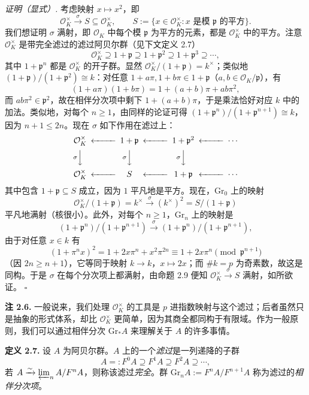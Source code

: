 \textit{证明（显式）.} 考虑映射 $x\mapsto x^2$，即
\[
  \mathcal{O}_K^{\times}\xrightarrow{\ \sigma\ }S\subseteq\mathcal{O}_K^{\times},
  \qquad S:=\{x\in\mathcal{O}_K^{\times}:x \text{ 是模 } \mathfrak{p} \text{ 的平方}\}.
\]
我们想证明 $\sigma$ 满射，即 $\mathcal{O}_K$ 中每个模 $\mathfrak{p}$ 为平方的元素，都是 $\mathcal{O}_K^{\times}$ 中的平方。注意 $\mathcal{O}_K^{\times}$ 是带完全滤过的滤过阿贝尔群（见下文定义 2.7）
\[
  \mathcal{O}_K^{\times}\supseteq 1+\mathfrak{p}\supseteq 1+\mathfrak{p}^2\supseteq 1+\mathfrak{p}^3\supseteq\cdots,
\]
其中 $1+\mathfrak{p}^n$ 都是 $\mathcal{O}_K^{\times}$ 的开子群。显然 $\mathcal{O}_K^{\times}/(1+\mathfrak{p})=k^{\times}$；类似地 $(1+\mathfrak{p})/(1+\mathfrak{p}^2)\cong k$：对任意 $1+a\pi,1+b\pi\in 1+\mathfrak{p}$（$a,b\in\mathcal{O}_K/\mathfrak{p}$），有
\[
  (1+a\pi)(1+b\pi)=1+(a+b)\pi+ab\pi^2,
\]
而 $ab\pi^2\in\mathfrak{p}^2$，故在相伴分次项中剩下 $1+(a+b)\pi$，于是乘法恰好对应 $k$ 中的加法。类似地，对每个 $n\geq 1$，由同样的论证可得 $(1+\mathfrak{p}^n)/(1+\mathfrak{p}^{n+1})\cong k$，因为 $n+1\leq 2n$。现在 $\sigma$ 如下作用在滤过上：
\[
  \begin{CD}
    \mathcal{O}_K^{\times} @<<< 1+\mathfrak{p} @<<< 1+\mathfrak{p}^2 @<<< \cdots\\
    @V{\sigma}VV @V{\sigma}VV @V{\sigma}VV\\
    \mathcal{O}_K^{\times} @<<< S @<<< 1+\mathfrak{p} @<<< \cdots
  \end{CD}
\]
其中包含 $1+\mathfrak{p}\subseteq S$ 成立，因为 $1$ 平凡地是平方。现在，$\mathrm{Gr}_0$ 上的映射
\[
  \mathcal{O}_K^{\times}/(1+\mathfrak{p})=k^{\times}\xrightarrow{\ \sigma\ }(k^{\times})^2=S/(1+\mathfrak{p})
\]
平凡地满射（核很小）。此外，对每个 $n\geq 1$，$\mathrm{Gr}_n$ 上的映射是
\[
  (1+\mathfrak{p}^n)/(1+\mathfrak{p}^{n+1})\xrightarrow{\ \sigma\ }(1+\mathfrak{p}^n)/(1+\mathfrak{p}^{n+1}),
\]
由于对任意 $x\in k$ 有
\[
  (1+\pi^n x)^2=1+2x\pi^n+x^2\pi^{2n}\equiv 1+2x\pi^n \pmod{\mathfrak{p}^{n+1}}
\]
（因 $2n\geq n+1$），它等同于映射 $k\to k$，$x\mapsto 2x$；而 $\#k=p$ 为奇素数，故这是同构。于是 $\sigma$ 在每个分次项上都满射，由命题 2.9 便知 $\mathcal{O}_K^{\times}\xrightarrow{\sigma}S$ 满射，如所欲证。
\hfill$\square$

\textbf{注 2.6.} 一般说来，我们处理 $\mathcal{O}_K^{\times}$ 的工具是 $p$ 进指数映射与这个滤过；后者虽然只是抽象的形式体系，却比 $\mathcal{O}_K^{\times}$ 更简单，因为其商全都同构于有限域。作为一般原则，我们可以通过相伴分次 $\mathrm{Gr}_*A$ 来理解关于 $A$ 的许多事情。

\textbf{定义 2.7.} 设 $A$ 为阿贝尔群。$A$ 上的一个\emph{滤过}是一列递降的子群
\[
  A=:F^0A\supseteq F^1A\supseteq F^2A\supseteq\cdots,
\]
若 $A\xrightarrow{\sim}\varprojlim_n A/F^nA$，则称该滤过\emph{完全}。群 $\mathrm{Gr}_nA:=F^nA/F^{n+1}A$ 称为滤过的\emph{相伴分次项}。

